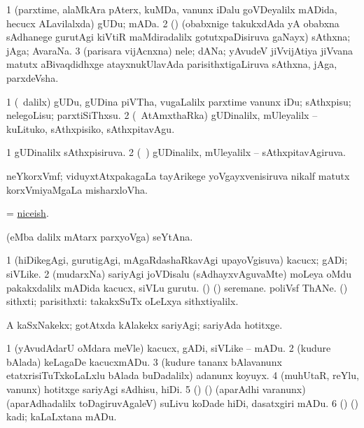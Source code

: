\bentry
{}
\gl{\nA}
\bmng
\bnum
\num{1} (parxtime, alaMkAra pAterx, kuMDa, \mo vanunx iDalu goVDeyalilx mADida, hecucx ALavilalxda) gUDu; mADa.  
\num{2} (\rUpa) (obabxnige takukxdAda yA obabxna sAdhanege gurutAgi kiVtiR maMdiradalilx gotutxpaDisiruva gaNayx) sAthxna; jAga; AvaraNa. 
\num{3} (parisara vijAcnxna) nele; dANa; yAvudeV jiVvijAtiya jiVvana matutx aBivaqdidhxge atayxnukUlavAda parisithxtigaLiruva sAthxna, jAga, parxdeVsha. 
\enum
\emng
\eentry

\bentry
{}
\gl{\sakirx}
\bmng
\bnum
\num{1} (\sA\ \BUkaq dalilx) gUDu, gUDina piVTha, \mo vugaLalilx parxtime \mo vanunx iDu; sAthxpisu; nelegoLisu; parxtiSiThxsu. 
\num{2} (\kanmu\ AtAmxthaRka) gUDinalilx, mUleyalilx -- kuLituko, sAthxpisiko, sAthxpitavAgu. 
\enum
\emng
\eentry

\bentry
{}
\gl{\gu}
\bmng
\bnum
\num{1} gUDinalilx sAthxpisiruva. 
\num{2} (\kanmu\ \AtAmx) gUDinalilx, mUleyalilx -- sAthxpitavAgiruva. 
\enum
\emng
\eentry

\bentry
{}
\gl{\nA}
\bmng
{} neYkorxVmf; viduyxtAtxpakagaLa tayArikege yoVgayxvenisiruva nikalf matutx korxVmiyaMgaLa misharxloVha. 
\emng
\eentry

\bentry
{}
\gl{\gu}
\bmng
= \hyperlink{niceish}{niceish}. 
\emng
\eentry

\bentry
{}
\gl{\nA}
\bmng
{}(eMba \pagu dalilx mAtarx parxyoVga) seYtAna. 
\emng
\eentry

\bentry
{}
\gl{\nA}
\bmng
\bnum
\num{1} (hiDikegAgi, gurutigAgi, mAgaRdashaRkavAgi upayoVgisuva) kacucx; gADi; siVLike. 
\num{2} (mudarxNa) sariyAgi joVDisalu (sAdhayxvAguvaMte) moLeya oMdu pakakxdalilx mADida kacucx, siVLu gurutu. 
 (\birx) (\ashi) 
\banum
{} seremane. 
 poliVsf ThANe. 
 (\AmA) sithxti; parisithxti:  takakxSuTx oLeLxya sithxtiyalilx. 
\eanum
\numie
\enum
\emng

\noindent
\gl{\pagu}
\bmng
{} A kaSxNakekx; gotAtxda kAlakekx sariyAgi; sariyAda hotitxge. 
\emng
\eentry

\bentry
{}
\gl{\sakirx}
\bmng
\bnum
\num{1} (yAvudAdarU oMdara meVle) kacucx, gADi, siVLike -- mADu. 
\num{2} (kudure bAlada) keLagaDe kacucxmADu. 
\num{3} (kudure tananx bAlavanunx etatxrisiTuTxkoLaLxlu bAlada buDadalilx) adanunx koyuyx. 
\num{4} (muhUtaR, reYlu, \mo vanunx) hotitxge sariyAgi sAdhisu, hiDi. 
\num{5} (\birx) (\ashi) (aparAdhi \mo varanunx) (aparAdhadalilx toDagiruvAgaleV) suLivu koDade hiDi, dasatxgiri mADu. 
\num{6} (\birx) (\ashi) kadi; kaLaLxtana mADu. 
\enum
\emng

